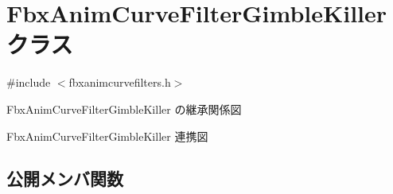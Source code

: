 \hypertarget{class_fbx_anim_curve_filter_gimble_killer}{}\section{Fbx\+Anim\+Curve\+Filter\+Gimble\+Killer クラス}
\label{class_fbx_anim_curve_filter_gimble_killer}


{\ttfamily \#include $<$fbxanimcurvefilters.\+h$>$}



Fbx\+Anim\+Curve\+Filter\+Gimble\+Killer の継承関係図


Fbx\+Anim\+Curve\+Filter\+Gimble\+Killer 連携図
\subsection*{公開メンバ関数}
